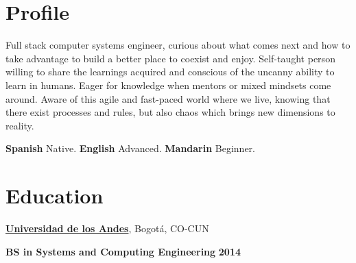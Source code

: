 \section{Profile}
Full stack computer systems engineer, curious about what comes next and how to
take advantage to build a better place to coexist and enjoy.
Self-taught person willing to share
the learnings acquired and
conscious of the uncanny ability to learn in humans. Eager for knowledge when
mentors or mixed mindsets come around.
Aware of this agile and fast-paced world where we live, knowing that there exist
processes and rules, but also chaos which brings new dimensions to reality.

\vspace{3.5mm}
\textbf{Spanish} Native. \textbf{English} Advanced. \textbf{Mandarin} Beginner.
%

%

\section{Education}
%
% 
% 
\href{http://www.topuniversities.com/universities/universidad-de-los-andes}{\textbf{Universidad de los Andes}},
Bogot\'{a}, CO-CUN
\begin{outerlist}
\item[\FA \faAngleDoubleRight] \textbf{BS in Systems and Computing Engineering}
\hfill \textbf{2014}
\end{outerlist}


